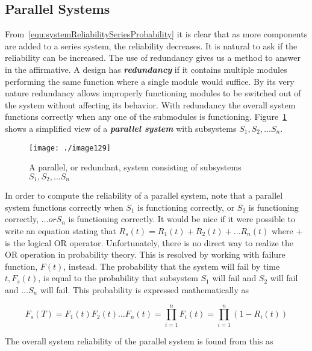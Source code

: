 {\subsection{Parallel Systems}
\label{subsection:parallel-systems}

From~\ref{equ:systemReliabilitySeriesProbability} it 
is clear that as more components are added to a series
system, the reliability decreases. It is natural to ask if the
reliability can be increased. The use of redundancy gives us a method to
answer in the affirmative. A design has \emph{\textbf{redundancy}} if it
contains multiple modules performing the same function where a single
module would suffice. By its very nature redundancy allows improperly
functioning modules to be switched out of the system without affecting
its behavior. With redundancy the overall system functions correctly
when any one of the submodules is functioning. 
Figure~\ref{figure:parallelSystem} shows a
simplified view of a \emph{\textbf{parallel system}} with subsystems
$S_1, S_2, \ldots S_n$.

\begin{figure}[h]
\centering
\texttt{[image: ./image129]}
\caption{A parallel, or redundant, system consisting of
subsystems $S_1, S_2, \ldots S_n$}
\label{figure:parallelSystem}
\end{figure}

In order to compute the reliability of a parallel system, note that a
parallel system functions correctly when $S_1$ is functioning correctly, or
$S_2$ is functioning correctly, $\ldots or S_n$ is functioning
correctly. It would be nice if it were possible to write an equation
stating that 
$R_s(t) = R_1(t) + R_2(t) + \ldots R_n(t)$ where + is
the logical OR operator. Unfortunately, there is no direct way to
realize the OR operation in probability theory. This is resolved by
working with failure function, $F(t)$, instead. The probability
that the system will fail by time $t, F_s(t)$, is equal to the probability
that subsystem $S_1$ will fail and $S_2$ will fail and $\ldots S_n$
will fail. This probability is expressed mathematically as


\begin{equation}
\label{equ:parallelFailureRate}
F_s(T) = F_1(t)F_2(t) \ldots F_n(t) = \prod_{i=1}^nF_i(t) = \prod_{i=1}^n(1-R_i(t))
\end{equation}


The overall system reliability of the parallel system is found from this
as

}
